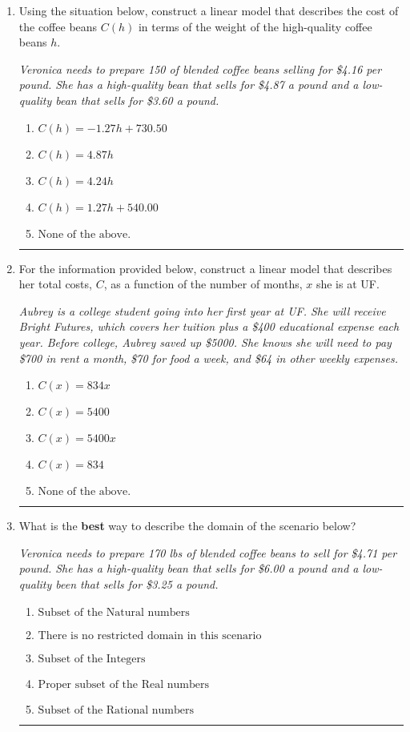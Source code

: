 \documentclass[14pt]{extbook}
\newcommand{\litem}[1]{\item#1\hspace*{-1cm}\rule{\textwidth}{0.4pt}}
\begin{document}
\begin{enumerate}
\litem{
Using the situation below, construct a linear model that describes the cost of the coffee beans $C(h)$ in terms of the weight of the high-quality coffee beans $h$.
\begin{center}
    \textit{ Veronica needs to prepare 150 of blended coffee beans selling for \$4.16 per pound. She has a high-quality bean that sells for \$4.87 a pound and a low-quality bean that sells for \$3.60 a pound. }
\end{center}
\begin{enumerate}[label=\Alph*.]
\item \( C(h) = -1.27 h + 730.50 \)
\item \( C(h) = 4.87 h \)
\item \( C(h) = 4.24 h \)
\item \( C(h) = 1.27 h + 540.00 \)
\item \( \text{None of the above.} \)

\end{enumerate} }
\litem{
For the information provided below, construct a linear model that describes her total costs, $C$, as a function of the number of months, $x$ she is at UF. 
\begin{center}
    \textit{ Aubrey is a college student going into her first year at UF. She will receive Bright Futures, which covers her tuition plus a \$400 educational expense each year. Before college, Aubrey saved up \$5000. She knows she will need to pay \$700 in rent a month, \$70 for food a week, and \$64 in other weekly expenses. }
\end{center}
\begin{enumerate}[label=\Alph*.]
\item \( C(x) = 834 x \)
\item \( C(x) = 5400 \)
\item \( C(x) = 5400 x \)
\item \( C(x) = 834 \)
\item \( \text{None of the above.} \)

\end{enumerate} }
\litem{
What is the \textbf{best} way to describe the domain of the scenario below?
\begin{center}
    \textit{ Veronica needs to prepare 170 lbs of blended coffee beans to sell for \$4.71 per pound. She has a high-quality bean that sells for \$6.00 a pound and a low-quality been that sells for \$3.25 a pound. }
\end{center}
\begin{enumerate}[label=\Alph*.]
\item \( \text{Subset of the Natural numbers} \)
\item \( \text{There is no restricted domain in this scenario} \)
\item \( \text{Subset of the Integers} \)
\item \( \text{Proper subset of the Real numbers} \)
\item \( \text{Subset of the Rational numbers} \)


\end{enumerate}}
\end{enumerate}
\end{document}
